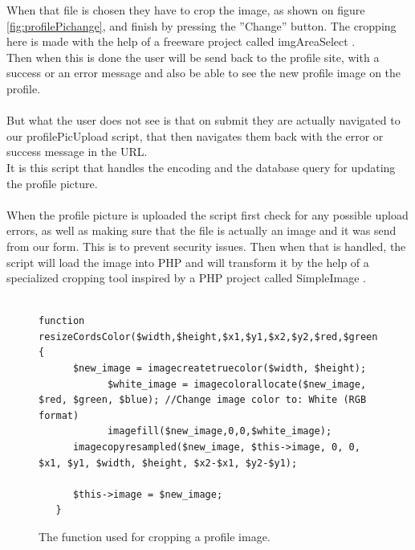 When that file is chosen they have to crop the image, as shown on figure \ref{fig:profilePichange}, and finish by pressing the ''Change'' button.
The cropping here is made with the help of a freeware project called imgAreaSelect \citep{imgAreaSelect}.\\
Then when this is done the user will be send back to the profile site, with a success or an error message and also be able to see the new profile image on the profile.\\
\\
But what the user does not see is that on submit they are actually navigated to our profilePicUpload script, that then navigates them back with the error or success message in the URL.\\
It is this script that handles the encoding and the database query for updating the profile picture.\\
\\
When the profile picture is uploaded the script first check for any possible upload errors, as well as making sure that the file is actually an image and it was send from our form. This is to prevent security issues.
Then when that is handled, the script will load the image into PHP and will transform it by the help of a specialized cropping tool inspired by a PHP project called SimpleImage \citep{simpleimage}.\\
\\

\lstset{language=PHP}
\begin{figure}[htbp]
\begin{lstlisting}[firstline=1]
   function resizeCordsColor($width,$height,$x1,$y1,$x2,$y2,$red,$green,$blue) {
      $new_image = imagecreatetruecolor($width, $height);
			$white_image = imagecolorallocate($new_image, $red, $green, $blue); //Change image color to: White (RGB format)
			imagefill($new_image,0,0,$white_image);
      imagecopyresampled($new_image, $this->image, 0, 0, $x1, $y1, $width, $height, $x2-$x1, $y2-$y1);
	  
      $this->image = $new_image;
   }
\end{lstlisting}
\caption{The function used for cropping a profile image.}
\label{lst:croppingProfile}
\end{figure}

